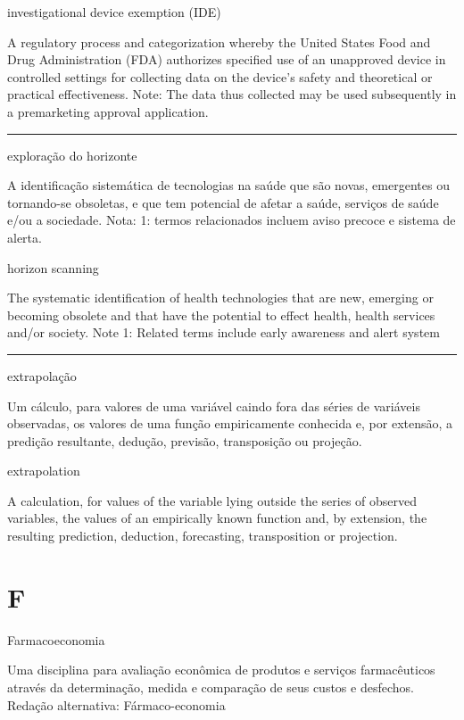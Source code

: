 \documentclass[
]{book}
\begin{document}
investigational device exemption (IDE)

A regulatory process and categorization whereby the United States Food and Drug Administration (FDA) authorizes specified use of an unapproved device in controlled settings for collecting data on the device's safety and theoretical or practical effectiveness. Note: The data thus collected may be used subsequently in a premarketing approval application.

\begin{center}\rule{0.5\linewidth}{0.5pt}\end{center}

exploração do horizonte

A identificação sistemática de tecnologias na saúde que são novas, emergentes ou tornando-se obsoletas, e que tem potencial de afetar a saúde, serviços de saúde e/ou a sociedade. Nota: 1: termos relacionados incluem aviso precoce e sistema de alerta.

horizon scanning

The systematic identification of health technologies that are new, emerging or becoming obsolete and that have the potential to effect health, health services and/or society. Note 1: Related terms include early awareness and alert system

\begin{center}\rule{0.5\linewidth}{0.5pt}\end{center}

extrapolação

Um cálculo, para valores de uma variável caindo fora das séries de variáveis observadas, os valores de uma função empiricamente conhecida e, por extensão, a predição resultante, dedução, previsão, transposição ou projeção.

extrapolation

A calculation, for values of the variable lying outside the series of observed variables, the values of an empirically known function and, by extension, the resulting prediction, deduction, forecasting, transposition or projection.

\hypertarget{f}{%
\chapter*{F}\label{f}}

Farmacoeconomia

Uma disciplina para avaliação econômica de produtos e serviços farmacêuticos através da determinação, medida e comparação de seus custos e desfechos. Redação alternativa: Fármaco-economia
\end{document}
